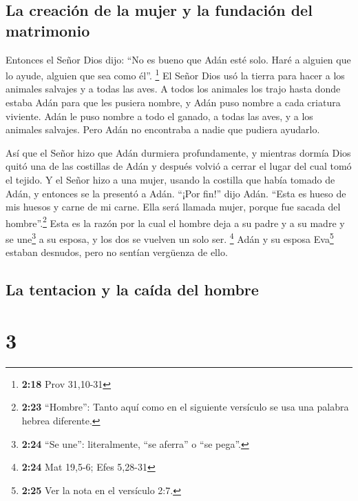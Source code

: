 \hypertarget{la-creaciuxf3n-de-la-mujer-y-la-fundaciuxf3n-del-matrimonio}{%
\subsection{La creación de la mujer y la fundación del
matrimonio}\label{la-creaciuxf3n-de-la-mujer-y-la-fundaciuxf3n-del-matrimonio}}

 Entonces el Señor Dios dijo: ``No es bueno que Adán esté
solo. Haré a alguien que lo ayude, alguien que sea como él''.
\footnote{\textbf{2:18} Prov 31,10-31}  El Señor Dios usó
la tierra para hacer a los animales salvajes y a todas las aves. A todos
los animales los trajo hasta donde estaba Adán para que les pusiera
nombre, y Adán puso nombre a cada criatura viviente. 
Adán le puso nombre a todo el ganado, a todas las aves, y a los animales
salvajes. Pero Adán no encontraba a nadie que pudiera ayudarlo.

 Así que el Señor hizo que Adán durmiera profundamente, y
mientras dormía Dios quitó una de las costillas de Adán y después volvió
a cerrar el lugar del cual tomó el tejido.  Y el Señor
hizo a una mujer, usando la costilla que había tomado de Adán, y
entonces se la presentó a Adán.  ``¡Por fin!'' dijo Adán.
``Esta es hueso de mis huesos y carne de mi carne. Ella será llamada
mujer, porque fue sacada del hombre''.\footnote{\textbf{2:23}
  ``Hombre'': Tanto aquí como en el siguiente versículo se usa una
  palabra hebrea diferente.}  Esta es la razón por la
cual el hombre deja a su padre y a su madre y se une\footnote{\textbf{2:24}
  ``Se une'': literalmente, ``se aferra'' o ``se pega''.} a su esposa, y
los dos se vuelven un solo ser. \footnote{\textbf{2:24} Mat 19,5-6; Efes
  5,28-31}  Adán y su esposa Eva\footnote{\textbf{2:25}
  Ver la nota en el versículo 2:7.} estaban desnudos, pero no sentían
vergüenza de ello.

\hypertarget{la-tentacion-y-la-cauxedda-del-hombre}{%
\subsection{La tentacion y la caída del
hombre}\label{la-tentacion-y-la-cauxedda-del-hombre}}

\hypertarget{section-2}{%
\section{3}\label{section-2}}

